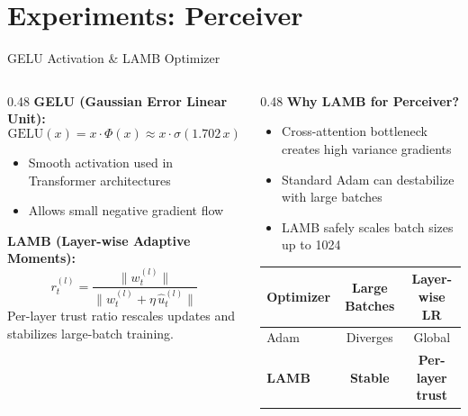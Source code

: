 \documentclass[aspectratio=169,11pt]{beamer}
\begin{document}
\section{Experiments: Perceiver}

\begin{frame}[shrink=5]{GELU Activation \& LAMB Optimizer}
  \begin{columns}[T,onlytextwidth]
    \begin{column}{0.48\textwidth}
      \small
      \textbf{GELU (Gaussian Error Linear Unit):}
      \[
      \text{GELU}(x) = x \cdot \Phi(x) \approx x \cdot \sigma(1.702\,x)
      \]
      \vspace{-0.25em}
      \begin{itemize}
        \item Smooth activation used in Transformer architectures
        \item Allows small negative gradient flow
      \end{itemize}

      \vspace{0.2em}
      \textbf{LAMB (Layer-wise Adaptive Moments):}
      \vspace{-0.25em}
      \[
      r_t^{(l)} = \frac{\|w_t^{(l)}\|}{\|w_t^{(l)} + \eta\, \hat{u}_t^{(l)}\|}
      \]
      \vspace{-0.55em}
      {\footnotesize Per-layer trust ratio rescales updates and stabilizes large-batch training.}
    \end{column}
    \begin{column}{0.48\textwidth}
      \small
      \textbf{Why LAMB for Perceiver?}
      \begin{itemize}
        \item Cross-attention bottleneck creates high variance gradients
        \item Standard Adam can \alert{destabilize} with large batches
        \item LAMB safely scales batch sizes up to 1024
      \end{itemize}

      \vspace{0.25em}
      \begin{table}
        \centering\scriptsize
        \begin{tabular}{lcc}
          \toprule
          \textbf{Optimizer} & \textbf{Large Batches} & \textbf{Layer-wise LR} \\
          \midrule
          Adam & Diverges & Global \\
          \textbf{LAMB} & \textbf{Stable} & \textbf{Per-layer trust} \\
          \bottomrule
        \end{tabular}
      \end{table}
    \end{column}
  \end{columns}
\end{frame}
\end{document}
